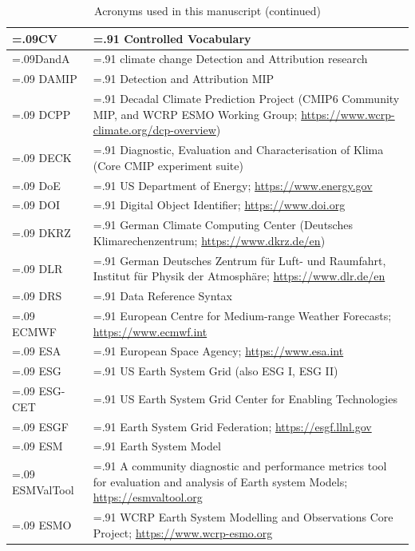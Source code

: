 \documentclass[manuscript]{copernicus}
\begin{document}
\addtocounter{table}{-1}
\begin{table}[htp]
\renewcommand{\arraystretch}{2}
\scriptsize
\centering
\caption{Acronyms used in this manuscript (continued)}
\resizebox{\textwidth}{!} {
	\begin{tabularx}{1\textwidth} { 
	  | >{\raggedright\arraybackslash\hsize=.09\hsize}X
	  | >{\centering\arraybackslash\hsize=.91\hsize}X | }
\hline
CV & Controlled Vocabulary\\ \hline
DandA & climate change Detection and Attribution research\\ \hline
DAMIP & Detection and Attribution MIP\\ \hline
DCPP & Decadal Climate Prediction Project (CMIP6 Community MIP, and WCRP ESMO Working Group; \url{https://www.wcrp-climate.org/dcp-overview})\\ \hline
DECK & Diagnostic, Evaluation and Characterisation of Klima (Core CMIP experiment suite)\\ \hline
DoE & US Department of Energy; \url{https://www.energy.gov}\\ \hline
DOI & Digital Object Identifier; \url{https://www.doi.org}\\ \hline
DKRZ & German Climate Computing Center (Deutsches Klimarechenzentrum; \url{https://www.dkrz.de/en})\\ \hline
DLR & German Deutsches Zentrum f{\"u}r Luft- und Raumfahrt, Institut f{\"u}r Physik der Atmosph{\"a}re; \url{https://www.dlr.de/en}\\ \hline
DRS & Data Reference Syntax\\ \hline
ECMWF & European Centre for Medium-range Weather Forecasts; \url{https://www.ecmwf.int}\\ \hline
ESA & European Space Agency; \url{https://www.esa.int}\\ \hline
ESG & US Earth System Grid (also ESG I, ESG II)\\ \hline
ESG-CET & US Earth System Grid Center for Enabling Technologies\\ \hline
ESGF & Earth System Grid Federation; \url{https://esgf.llnl.gov}\\ \hline
ESM & Earth System Model\\ \hline
ESMValTool & A community diagnostic and performance metrics tool for evaluation and analysis of Earth system Models; \url{https://esmvaltool.org}\\ \hline
ESMO & WCRP Earth System Modelling and Observations Core Project; \url{https://www.wcrp-esmo.org}\\ \hline

\end{tabularx}}
\end{table}
\end{document}
